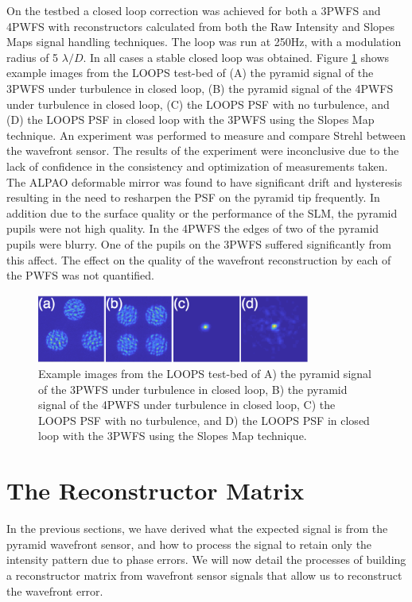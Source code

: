 On the testbed a closed loop correction was achieved for both a 3PWFS and 4PWFS with reconstructors calculated from both the Raw Intensity and Slopes Maps signal handling techniques. The loop was run at 250Hz, with a modulation radius of 5 $\lambda/D$. In all cases a stable closed loop was obtained. Figure \ref{fig:LOOOPS} shows example images from the LOOPS test-bed of (A) the pyramid signal of the 3PWFS under turbulence in closed loop, (B) the pyramid signal of the 4PWFS under turbulence in closed loop, (C) the LOOPS PSF with no turbulence, and (D) the LOOPS PSF in closed loop with the 3PWFS using the Slopes Map technique. An experiment was performed to measure and compare Strehl between the wavefront sensor. The results of the experiment were inconclusive due to the lack of confidence in the consistency and optimization of measurements taken. The ALPAO deformable mirror was found to have significant drift and hysteresis resulting in the need to resharpen the PSF on the pyramid tip frequently. In addition due to the surface quality or the performance of the SLM, the pyramid pupils were not high quality. In the 4PWFS the edges of two of the pyramid pupils were blurry. One of the pupils on the 3PWFS suffered significantly from this affect. The effect on the quality of the wavefront reconstruction by each of the PWFS was not quantified. 

\begin{figure}
    \centering
    \includegraphics[width=0.8\textwidth]{Chapter Materials/Chapter Two Materials/LOOPS.png}
    \caption{Example images from the LOOPS test-bed of A) the pyramid signal of the 3PWFS under turbulence in closed loop, B) the pyramid signal of the 4PWFS under turbulence in closed loop, C) the LOOPS PSF with no turbulence, and D) the LOOPS PSF in closed loop with the 3PWFS using the Slopes Map technique.}
    \label{fig:LOOOPS}
\end{figure}

\section{The Reconstructor Matrix}

In the previous sections, we have derived what the expected signal is from the pyramid wavefront sensor, and how to process the signal to retain only the intensity pattern due to phase errors. We will now detail the processes of building a reconstructor matrix from wavefront sensor signals that allow us to reconstruct the wavefront error.
 
